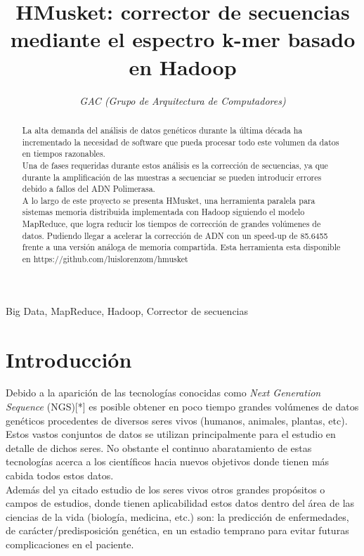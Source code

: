 \documentclass[conference]{IEEEtran}
\begin{document}
\title{HMusket: corrector de secuencias mediante el espectro k-mer basado en Hadoop}

\author{
	\textit{GAC (Grupo de Arquitectura de Computadores)}\\
}

\maketitle

\begin{abstract}
La alta demanda del análisis de datos genéticos durante la última década ha incrementado la necesidad de software que pueda procesar todo este volumen da datos en tiempos razonables.\\
Una de fases requeridas durante estos análisis es la corrección de secuencias, ya que durante la amplificación de las muestras a secuenciar se pueden introducir errores debido a fallos del ADN Polimerasa.\\
A lo largo de este proyecto se presenta HMusket, una herramienta paralela para sistemas memoria distribuida implementada con Hadoop siguiendo el modelo MapReduce, que logra reducir los tiempos de corrección de grandes volúmenes de datos. Pudiendo llegar a acelerar la corrección de ADN con un speed-up de 85.6455 frente a una versión análoga de memoria compartida. Esta herramienta esta disponible en https://github.com/luislorenzom/hmusket
\end{abstract}

\begin{IEEEkeywords}
Big Data, MapReduce, Hadoop, Corrector de secuencias
\end{IEEEkeywords}

\section{Introducción}
Debido a la aparición de las tecnologías conocidas como \textit{Next Generation Sequence} (NGS)[*] es posible obtener en poco tiempo grandes volúmenes de datos genéticos procedentes de diversos seres vivos (humanos, animales, plantas, etc). Estos vastos conjuntos de datos se utilizan principalmente para el estudio en detalle de dichos seres. 
No obstante el continuo abaratamiento de estas tecnologías acerca a los científicos hacia nuevos objetivos donde tienen más cabida todos estos datos.\\
Además del ya citado estudio de los seres vivos otros grandes propósitos o campos de estudios, donde tienen aplicabilidad estos datos dentro del área de las ciencias de la vida (biología, medicina, etc.) son: la predicción de enfermedades, de carácter/predisposición genética, en un estadio temprano para evitar futuras complicaciones en el paciente. \\
\end{document}
